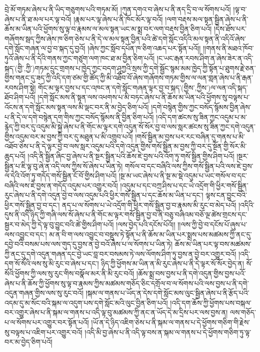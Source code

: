བྲེ་མོ་གཏམ་ཞེས་པ་ནི་ཡིད་གཅུགས་པའི་གཏམ་མོ། །ཀུན་དགའ་བ་ཞེས་པ་ནི་ནད་དྲི་བ་ལ་སོགས་པའོ། །ལྟ་བ་ཞེས་པ་ནི་ཐ་མལ་པར་ལྟ་བའོ། །རྣམ་པར་ལྟ་ཞེས་པ་ནི་ཁོང་མོར་ལྟ་བའོ། །ལག་བརྡས་མལ་སྟན་སྦྱིན་ཞེས་པ་ནི་ཆོས་མ་ཡིན་པའི་ཕྱོགས་སུ་ལྟ་བ་རྣམས་ལ་མལ་སྟན་ཡང་མ་སྨྲ་བར་ལག་བརྡས་བྱིན་ཅིག་པའོ། །དེས་ཐོས་པར་གཞོགས་སྦད་ཀྱིས་ཞེས་ཁ་ཅིག་ཅེས་པ་ནི་དེ་ལ་མལ་སྟན་བྱིན་པའི་ཚེ་དགེ་སློང་འདིའི་མལ་སྟན་ནི་འདིའོ་ཞེས་དགེ་སློང་གཞན་ལ་བྱ་བ་སྐད་དུ་བྱའོ། །ཞེས་ཀྱང་སློབ་དཔོན་ཁ་ཅིག་འཆད་པར་སྟོན་པའོ།། །།གནས་ནི་མཐའ་ཁོབ་ཏུའོ་ཞེས་པ་ནི་དེའི་གནས་ཀྱང་གཙུག་ལག་ཁང་ཐ་མ་བྱིན་ཅིག་པའོ། །ང་ཡང་རྒན་རབས་ཤིག་ན་ཞེས་ཟེར་ན་འདི་སྐད་(གྱི་‚ཀྱི་)གཏམ་དྲུང་གྲགས་པ་ཁྱེད་ཀྱང་བདག་ཤཱཀྱའི་སྲས་ཀྱི་དགེ་སྦྱོང་སྙམ་མམ་ཁྱེད་ཀྱི་སྟོན་པ་ཐུགས་རྗེ་ཅན་གྱིས་གནང་དུ་ཟད་ཀྱི་འདི་དག་ཙམ་གྱི་ཚོད་ཀྱི་མི་འཐོབ་བོ་ཞེས་གཞོགས་གཏམ་གྱིས་ལ་ལན་གླན་ཞེས་པ་ནི་རྒན་རབས་ཤིག་སྟེ། གོང་མ་ལྟར་བྱས་པ་དང་འཁང་ན་དགེ་སློང་གཞན་ལྟར་བྱ་བ་སྐད་(གྱིས་‚ཀྱིས་)ལ་ལན་འདི་སྐད་ཐོབ་ཤིག་པའོ། །དགེ་སློང་མས་ནི་སྟན་ལས་འཕགས་པ་མི་བཏང་ཞེས་པ་ནི་ཆོས་མ་ཡིན་པའི་ཕྱོགས་སུ་བལྟས་པ་འོངས་ན་དགེ་སློང་མས་སྟན་ལས་མི་ལྡང་བར་ནི་མ་བྱེད་ཅིག་པའོ། །དགེ་བསྙེན་གྱིས་ཀྱང་བསོད་སྙོམས་བྱིན་ཞེས་པ་ནི་དེ་ལ་དགེ་བསྙེན་དག་གིས་ཀྱང་བསོད་སྙོམས་ནི་བྱིན་ཅིག་པའོ། །འདི་དག་ཚངས་སུ་ཟིན་ཀྱང་འདུམ་པ་མ་རྙེད་ཀྱི་བར་དུ་འདུམ་མི་སྐྱེ་ཞེས་པ་ནི་གོང་མ་ལྟར་དགེ་འདུན་སོ་སོར་བྱ་བ་ལས་སླར་ཚངས་སུ་ཟིན་ཀྱང་དགེ་འདུན་གྱིས་འདུམ་བར་མ་བྱས་ཀྱི་བར་དུ་མཐུན་པ་མི་འགྲུབ་པའོ། །གསོ་སྦྱིན་མ་བྱས་པར་རང་བཞིན་དུ་གནས་པ་མི་འཐོབ་ཅེས་པ་ནི་དེ་ལྟར་བྱེ་བ་ལས་སླར་འདུམ་པའི་དགེ་འདུན་གྱིས་གསོ་སྦྱིན་མ་བྱས་ཀྱི་བར་དུ་སྔོན་གྱི་སོར་མི་ཆུད་པའོ། །འདི་ནི་སྦྱིན་ཞིང་བྱ་ཞེས་པ་ནི་སྔར་སྦྱིན་པའི་ཆོས་ཇེ་བྱས་པའི་འོག་ཏུ་གསོ་སྦྱིན་གྱིས་ཤིག་པའོ། །སྔར་སྦྱིན་པ་ཇི་ལྟ་བུ་ཞེ་ན་འདི་ལས་ཀྱིས་སོ་ཞེས་པ་ཡིན་ཏེ། གསོལ་བ་དང་བཞིའི་ལས་ཀྱིས་གསོ་སྦྱིན་པའི་ལས་ཇེ་བྱས་ལ་དེའི་འོག་ཏུ་གདོད་གསོ་སྦྱིན་ངོ་བོ་གྱིས་ཤིག་པའོ། །སྔ་མ་ཡང་ཞེས་པ་ནི་སྔ་མ་སྡེ་འདུམ་པ་ཡང་གསོལ་བ་དང་བཞིའི་ལས་ཇེ་བྱས་ན་གདོད་འདུམ་པར་འགྱུར་བའོ། །འདུམ་པ་དང་བཀྲ་ཤིས་པ་དང་ཡེ་འདྲོག་གི་ཕྱིར་གསོ་སྦྱིན་རུང་ཞེས་པ་ནི་དགེ་འདུན་བྱེ་བ་ལས་འདུམ་པའི་ཕྱིར་གསོ་སྦྱིན་པ་དང་ཆོས་མ་ཡིན་པ་དང་། ལྟས་ངན་བྱུང་བའི་ཕྱིར་གསོ་སྦྱིན་བྱ་བ་དང་། ནད་པ་ལ་སོགས་པ་ཡེ་འདྲོག་གི་ཕྱིར་གསོ་སྦྱིན་བྱ་བ་རྣམས་མི་རུང་བ་མེད་པའོ། །འདིའི་དུས་ནི་འདི་ཉིད་ཀྱི་གཞི་ལས་སོ་ཞེས་པ་ནི་གོང་མ་ལྟར་གསོ་སྦྱིན་བྱ་བ་ནི་བཅུ་བཞིའམ་བཅོ་ལྔ་ཚེས་གྲངས་དང་སྦྱར་བ་མེད་ཀྱི་དེ་ལྟ་བུ་བྱུང་བའི་ཚེ་གྱིས་ཤིག་པའོ། །ལས་བྱེད་པའི་དངོས་པོའོ།། །།ལས་ཀྱི་བྱེ་བ་དངོས་པོ་ཞུས་པ་ལས་འབྱུང་བ་དང་། མ་ན་བི་ག་ལས་འབྱུང་བ་བསྡུས་ཏེ་སྟོན་པ་ནི་ཆོས་མ་ཡིན་པར་སྨྲས་པས་མཚམས་ཀྱི་ནང་དུ་དབྱེ་བའི་བསམ་པས་ལས་གུད་དུ་བྱས་ན་བྱེ་བའོ་ཞེས་པ་ལ་སོགས་པ་ཡིན་ཏེ། ཆོས་མ་ཡིན་པར་ལྟ་བས་མཚམས་ཀྱི་ནང་དུ་དགེ་འདུན་གཞན་དང་བྱེ་ཡང་བླ་བར་བསམས་ཏེ་ལས་ལོགས་ཤིག་ཏུ་བྱས་ན་བྱེ་བར་འགྱུར་བའོ། །འདི་དག་སོ་སོའི་ལས་སུ་མི་རུང་བ་ཞེས་པ་དང་། ཉིད་ཀྱི་ཕྱོགས་མ་ཡིན་ན་མི་རུང་ཞེས་པ་ནི་དེ་ལྟར་སོ་སོར་བྱེད་ན། སོ་སོའི་ཕྱོགས་ཀྱི་ལས་སུ་རུང་གིས་བསྣོལ་མར་ནི་མི་རུང་བའོ། །ཆོས་སྨྲ་བས་བྱས་པ་ནི་དགེ་འདུན་གྱིས་བྱས་པའོ་ཞེས་པ་ནི་ཆོས་ཀྱི་ཕྱོགས་སུ་ལྟ་བ་རྣམས་ཀྱིས་མཚམས་གཅོད་ཅིང་དགྲོལ་བ་ལ་སོགས་པའི་ལས་བྱས་པ་ནི་དགེ་འདུན་གཞན་གྱིས་ལས་སུ་རུང་བའོ། །སྐམ་ལ་གནས་པ་ཡོད་ན་དེས་དགེ་སློང་མས་ལུང་སྦྱིན་ཞེས་པ་ནི་རྩོད་པའི་འདམ་དུ་མ་སོང་བའི་སྐམ་ལ་འདུག་པས་དགེ་སློང་མའི་ལུང་བྱིན་ཅིག་པའོ། །འདི་དག་ཆོས་ཀྱི་ཕྱོགས་པས་བསྐལ་བར་འགྱུར་ཞེས་པ་ནི་སྐམ་ལ་གནས་པ་འདི་ལྟ་བུ་མཚམས་ཀྱི་ནང་ན་ཡོད་དེ་མ་དྲིས་པར་ལས་བྱས་ན། ལས་གཅོད་པ་ལ་སོགས་པར་འགྱུར་བར་སྟོན་པའོ། །ཡོ་ན་དེ་ཉིད་འཇིག་ཅེས་པ་ནི་སྐམ་ལ་གནས་པ་དེ་ཕྱོགས་གཅིག་གི་རྗེས་སུ་བལྟས་པ་འཇིག་པར་འགྱུར་བའོ། །འདི་མི་བྱ་ཞེས་པ་ནི་འདི་ལྟ་བས་ན་སྐམ་ལ་གནས་པ་དེ་ཕྱོགས་གཅིག་ཏུ་ལྟ་བར་མ་བྱེད་ཅིག་པའོ། 